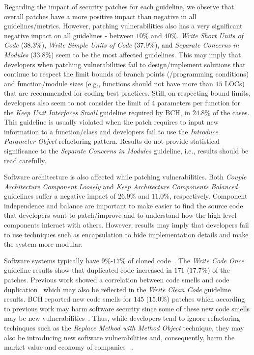 \documentclass[10pt,conference]{IEEEtran}
\begin{document}
Regarding the impact of security patches for each guideline, we observe
that overall patches have a more positive impact than negative in
all guidelines/metrics. However, patching vulnerabilities also has a very
significant negative impact on all guidelines - between $10\%$ and $40\%$. 
\emph{Write Short Units of 
Code} ($38.3\%$), \emph{Write Simple Units of Code} ($37.9\%$),  and \emph{Separate Concerns in Modules} ($33.8\%$) seem to be the 
most affected guidelines. 
This may imply that developers when patching 
vulnerabilities fail to design/implement solutions that continue to respect 
the limit bounds of branch points (/programming conditions) and function/module 
sizes (e.g., functions should not have more than $15$ LOCs) that are recommended
for coding best practices. Still, on 
respecting bound limits, developers also seem to not consider the limit 
of $4$ parameters per function for the \emph{Keep Unit Interfaces Small} 
guideline required by BCH, in $24.8\%$ of the cases. This guideline is usually
violated when the patch requires to input new information to a function/class 
and developers fail to use the \emph{Introduce Parameter Object} refactoring 
pattern. Results do not provide statistical significance to the \emph{Separate 
Concerns in Modules} guideline, i.e., results should be read carefully. 

Software architecture is also affected while patching vulnerabilities.
Both \emph{Couple Architecture Component Loosely} and \emph{Keep
Architecture Components Balanced} guidelines suffer a negative impact of 
$26.9\%$ and $11.0\%$, respectively. Component independence and balance
are important to make easier to find the source code that developers
want to patch/improve and to understand how the high-level components
interact with others. However, results may imply that developers
fail to use techniques such as encapsulation to hide implementation
details and make the system more modular.

Software systems typically have $9\%$-$17\%$ of cloned code~\cite{5773403}. 
The \emph{Write Code Once} guideline results show that duplicated code 
increased in $171$ ($17.7\%$) of the patches. Previous work showed a 
correlation between code smells and code duplication~\cite{7476787} 
which may also be reflected in the \emph{Write Clean Code} guideline results. 
BCH reported new code smells for $145$ ($15.0\%$) patches which according 
to previous work may harm software security since some of these new code
smells may be new vulnerabilities~\cite{8819456}.
Thus, while developers 
tend to ignore refactoring techinques such as the \emph{Replace Method 
with Method Object} technique, they may also be introducing new software 
vulnerabilities and, consequently, harm the market value and economy of companies
~\cite{4267025}.
\end{document}
